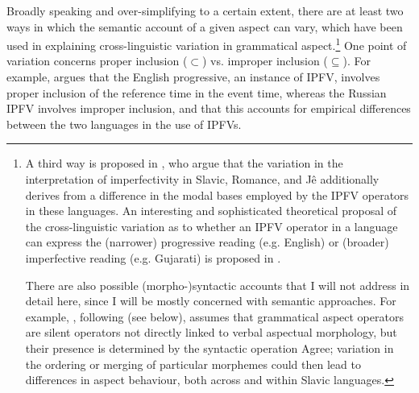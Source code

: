 \documentclass[output=paper,colorlinks,citecolor=brown]{langscibook}
\begin{document}
\largerpage
Broadly speaking and over-simplifying to a certain extent, there are at least two ways in which the semantic account of a given aspect can vary, which have been used in explaining cross-linguistic variation in grammatical aspect.\footnote{A third way is proposed in \citet{Arregui.etal2014}, who argue that the variation in the interpretation of imperfectivity in Slavic, Romance, and Jê additionally derives from a difference in the modal bases employed by the IPFV operators in these languages. An interesting and sophisticated theoretical proposal of the cross-linguistic variation as to whether an IPFV operator in a language can express the (narrower) progressive reading (e.g. English) or (broader) imperfective reading (e.g. Gujarati) is proposed in \citet{deo15}.

There are also possible (morpho-)syntactic accounts that I will not address in detail here, since I will be mostly concerned with semantic approaches. For example, \citet[][]{biskup23adv}, following \citet{Tatevosov2011,Tatevosov2015b} (see below), assumes that grammatical aspect operators are silent operators not directly linked to verbal aspectual morphology, but their presence is determined by the syntactic operation Agree; variation in the ordering or merging of particular morphemes could then lead to differences in aspect behaviour, both across and within Slavic languages.} One point of variation concerns proper inclusion ($\subset$) vs. improper inclusion ($\subseteq$). For example, \citet{altshuler14} argues that the English progressive, an instance of IPFV, involves proper inclusion of the reference time in the event time, whereas the Russian IPFV involves improper inclusion, and that this accounts for empirical differences between the two languages in the use of IPFVs.
\end{document}
